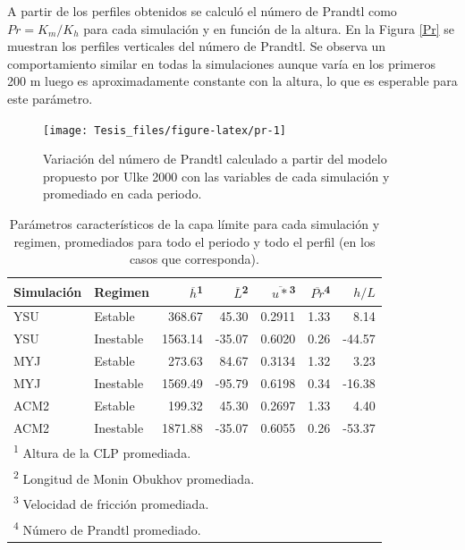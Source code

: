 \documentclass[12pt,spanish,oneside, a4paper]{book}
\begin{document}
A partir de los perfiles obtenidos se calculó el número de Prandtl como
\(Pr = K_m/K_h\) para cada simulación y en función de la altura. En la
Figura \ref{Pr} se muestran los perfiles verticales del número de
Prandtl. Se observa un comportamiento similar en todas la simulaciones
aunque varía en los primeros 200 m luego es aproximadamente constante
con la altura, lo que es esperable para este parámetro.

\begin{figure}

{\centering \texttt{[image: Tesis\_files/figure-latex/pr-1]} 

}

\caption{Variación del número de Prandtl calculado a partir del modelo propuesto por Ulke 2000 con las variables de cada simulación y promediado en cada periodo. \label{Pr}}\label{fig:pr}
\end{figure}

\begin{table}

\caption{\label{tab:tabla-clp}Parámetros característicos de la capa límite para cada simulación y regimen, promediados para todo el periodo y todo el perfil (en los casos que corresponda). \label{tabla-clp}}
\centering
\begin{tabular}[t]{llrrrrr}
\toprule
Simulación & Regimen & $\overline{h}$\textsuperscript{1} & $\overline{L}$\textsuperscript{2} & $\overline{u*}$\textsuperscript{3} & $\overline{Pr}$\textsuperscript{4} & $h/L$\\
\midrule
YSU & Estable & 368.67 & 45.30 & 0.2911 & 1.33 & 8.14\\
YSU & Inestable & 1563.14 & -35.07 & 0.6020 & 0.26 & -44.57\\
MYJ & Estable & 273.63 & 84.67 & 0.3134 & 1.32 & 3.23\\
MYJ & Inestable & 1569.49 & -95.79 & 0.6198 & 0.34 & -16.38\\
ACM2 & Estable & 199.32 & 45.30 & 0.2697 & 1.33 & 4.40\\
ACM2 & Inestable & 1871.88 & -35.07 & 0.6055 & 0.26 & -53.37\\
\bottomrule
\multicolumn{7}{l}{\textsuperscript{1} Altura de la CLP promediada.}\\
\multicolumn{7}{l}{\textsuperscript{2} Longitud de Monin Obukhov promediada.}\\
\multicolumn{7}{l}{\textsuperscript{3} Velocidad de fricción promediada.}\\
\multicolumn{7}{l}{\textsuperscript{4} Número de Prandtl promediado.}\\
\end{tabular}
\end{table}
\end{document}
